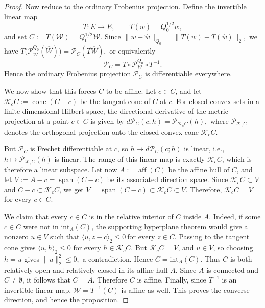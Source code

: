 \documentclass{article}
\begin{document}
\begin{proof}
Now reduce to the ordinary Frobenius projection. Define the invertible linear
map
\[
T:E\to E,\qquad T(w)=Q_0^{1/2}w,
\]
and set $C:=T(\mathscr W)=Q_0^{1/2}\mathscr W .$
Since 
$\|w-\widehat w\|_{Q_0} =
\|T(w)-T(\widehat w)\|_2,$
we have $
T\bigl(\mathcal P_{\mathscr W}^{Q_0}(\widehat W)\bigr) =
\mathcal P_C(T\widehat W),$
or equivalently
\[
\mathcal P_C
=
T\circ \mathcal P_{\mathscr W}^{Q_0}\circ T^{-1}.
\]
Hence the ordinary Frobenius projection \(\mathcal P_C\) is differentiable
everywhere.

We now show that this forces \(C\) to be affine. Let \(c\in C\), and let $
\mathcal K_cC:=\overline{\operatorname{cone}(C-c)}
$
be the tangent cone of \(C\) at \(c\). For closed convex sets in a finite
dimensional Hilbert space, the directional derivative of the metric projection
at a point \(c\in C\) is given by $d\mathcal P_C(c;h)=\mathcal P_{\mathcal K_cC}(h),$
where \(\mathcal P_{\mathcal K_cC}\) denotes the orthogonal projection onto the closed
convex cone \(\mathcal K_cC\).

But \(\mathcal P_C\) is Frechet differentiable at \(c\), so
$h\mapsto d\mathcal P_C(c;h)$
is linear, i.e., \(h\mapsto \mathcal P_{\mathcal K_cC}(h)\) is linear. The range of
this linear map is exactly \(\mathcal K_cC\), which is therefore a linear subspace.
Let now $A:=\operatorname{aff}(C)$
be the affine hull of \(C\), and let $
V:=A-c=\operatorname{span}(C-c)
$
be its associated direction space. Since \(\mathcal K_cC\subset V\) and
\(C-c\subset \mathcal K_cC\), we get
$
V=\operatorname{span}(C-c)\subset \mathcal K_cC\subset V.
$
Therefore, $
\mathcal K_cC=V
$
for every \(c\in C\).

We claim that every \(c\in C\) is in the relative interior of \(C\) inside
\(A\). Indeed, if some \(c\in C\) were not in \(\mathrm{int}_A(C)\), the
supporting hyperplane theorem would give a nonzero \(u\in V\) such that $\langle u,z-c\rangle_2\le 0\  
  \text{for every }z\in C
$. Passing to the tangent cone gives
$
\langle u,h\rangle_2\le 0\,\,
 \text{for every }h\in \mathcal K_cC.
$
But \(\mathcal K_cC=V\), and \(u\in V\), so choosing \(h=u\) gives $
\|u\|_2^2\le0,
$
a contradiction. Hence \(C=\mathrm{int}_A(C)\).
Thus \(C\) is both relatively open and relatively closed in its affine hull
\(A\). Since \(A\) is connected and \(C\neq\emptyset\), it follows that $
C=A.
$
Therefore \(C\) is affine. Finally, since \(T^{-1}\) is an invertible linear map, $
\mathscr W=T^{-1}(C)
$
is affine as well.
This proves the converse direction, and hence the proposition.
\end{proof}
\end{document}
